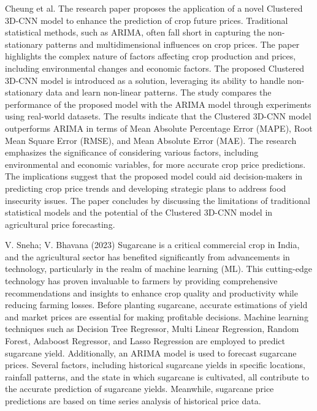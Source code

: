         Cheung et al. \cite{cheung2023} The research paper proposes the application of a novel Clustered 3D-CNN model to enhance the prediction of crop future prices. Traditional statistical methods, such as ARIMA, often fall short in capturing the non-stationary patterns and multidimensional influences on crop prices. The paper highlights the complex nature of factors affecting crop production and prices, including environmental changes and economic factors. The proposed Clustered 3D-CNN model is introduced as a solution, leveraging its ability to handle non-stationary data and learn non-linear patterns. The study compares the performance of the proposed model with the ARIMA model through experiments using real-world datasets. The results indicate that the Clustered 3D-CNN model outperforms ARIMA in terms of Mean Absolute Percentage Error (MAPE), Root Mean Square Error (RMSE), and Mean Absolute Error (MAE). The research emphasizes the significance of considering various factors, including environmental and economic variables, for more accurate crop price predictions. The implications suggest that the proposed model could aid decision-makers in predicting crop price trends and developing strategic plans to address food insecurity issues. The paper concludes by discussing the limitations of traditional statistical models and the potential of the Clustered 3D-CNN model in agricultural price forecasting.
        
        V. Sneha; V. Bhavana (2023) \cite{sneha2023} Sugarcane is a critical commercial crop in India, and the agricultural sector has benefited significantly from advancements in technology, particularly in the realm of machine learning (ML). This cutting-edge technology has proven invaluable to farmers by providing comprehensive recommendations and insights to enhance crop quality and productivity while reducing farming losses. Before planting sugarcane, accurate estimations of yield and market prices are essential for making profitable decisions. Machine learning techniques such as Decision Tree Regressor, Multi Linear Regression, Random Forest, Adaboost Regressor, and Lasso Regression are employed to predict sugarcane yield. Additionally, an ARIMA model is used to forecast sugarcane prices. Several factors, including historical sugarcane yields in specific locations, rainfall patterns, and the state in which sugarcane is cultivated, all contribute to the accurate prediction of sugarcane yields. Meanwhile, sugarcane price predictions are based on time series analysis of historical price data.
        
